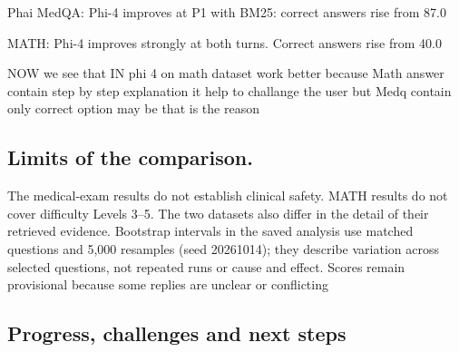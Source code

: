 \documentclass[11pt,a4paper]{article}
\begin{document}
Phai
MedQA: Phi-4 improves at P1 with BM25: correct answers rise from 87.0%

MATH: Phi-4 improves strongly at both turns. Correct answers rise from 40.0%

NOW we see that IN phi 4 on math dataset work better because Math answer contain step by step explanation it help to challange the user  but Medq contain only correct option may be that is the reason 

\subsection{Limits of the comparison. }
The medical-exam results do not establish clinical safety. MATH results do not cover
difficulty Levels 3–5. The two datasets also differ in the detail of their retrieved evidence.
Bootstrap intervals in the saved analysis use matched questions and 5,000 resamples (seed
20261014); they describe variation across selected questions, not repeated runs or cause and
effect. Scores remain provisional because some replies are unclear or conflicting

\subsection{Progress, challenges and next steps}
\end{document}
